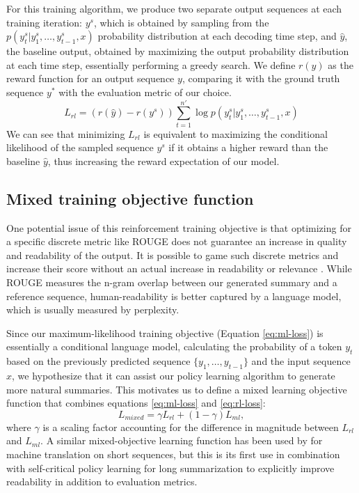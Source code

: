 \documentclass{article} \usepackage{iclr2018_arxiv,times}
\begin{document}
For this training algorithm, we produce two separate output sequences at each training iteration: $y^{s}$, which is obtained by sampling from the $p(y^s_t | y^s_1, \ldots, y^s_{t-1}, x)$ probability distribution at each decoding time step, and $\hat{y}$, the baseline output, obtained by maximizing the output probability distribution at each time step, essentially performing a greedy search. We define $r(y)$ as the reward function for an output sequence $y$, comparing it with the ground truth sequence $y^*$ with the evaluation metric of our choice.
\begin{equation}
L_{rl} = (r(\hat{y}) - r(y^{s})) \sum_{t=1}^{n'} \log p(y^s_t | y^s_1, \ldots, y^s_{t-1}, x)
\label{eq:rl-loss}
\end{equation}
We can see that minimizing $L_{rl}$ is equivalent to maximizing the conditional likelihood of the sampled sequence $y^{s}$ if it obtains a higher reward than the baseline $\hat{y}$, thus increasing the reward expectation of our model.

\subsection{Mixed training objective function}

One potential issue of this reinforcement training objective is that optimizing for a specific discrete metric like ROUGE does not guarantee an increase in quality and readability of the output. It is possible to game such discrete metrics and increase their score without an actual increase in readability or relevance \citep{liu2016}. While ROUGE measures the n-gram overlap between our generated summary and a reference sequence, human-readability is better captured by a language model, which is usually measured by perplexity.

Since our maximum-likelihood training objective (Equation \ref{eq:ml-loss}) is essentially a conditional language model, calculating the probability of a token $y_t$ based on the previously predicted sequence $\{y_1, \ldots, y_{t-1} \}$ and the input sequence $x$, we hypothesize that it can assist our policy learning algorithm to generate more natural summaries. This motivates us to define a mixed learning objective function that combines equations \ref{eq:ml-loss} and \ref{eq:rl-loss}:
\begin{equation}
L_{mixed} = \gamma L_{rl} + (1 - \gamma) L_{ml},
\label{eq:mixed-loss}
\end{equation}
where $\gamma$ is a scaling factor accounting for the difference in magnitude between $L_{rl}$ and $L_{ml}$. A similar mixed-objective learning function has been used by \citet{wu2016} for machine translation on short sequences, but this is its first use in combination with self-critical policy learning for long summarization to explicitly improve readability in addition to evaluation metrics.
\end{document}
